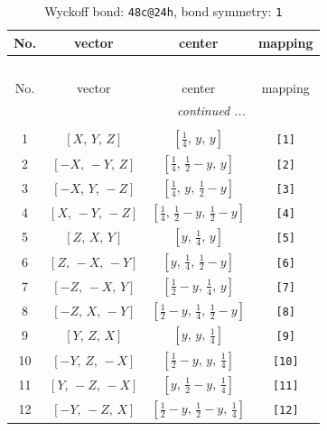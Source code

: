 \documentclass[fleqn,8pt]{jsarticle}
\begin{document}
\begin{longtable}{cccc}
\caption{Wyckoff bond: {\tt 48c@24h}, bond symmetry: {\tt 1}}
 \\
 \hline \hline
No. & vector & center & mapping \\ \hline \endfirsthead

\multicolumn{3}{l}{\tablename\ \thetable{}} \\
 \hline \hline
No. & vector & center & mapping \\ \hline \endhead

 \hline \hline
\multicolumn{3}{r}{\footnotesize\it continued ...} \\ \endfoot

 \hline \hline
\multicolumn{3}{r}{} \\ \endlastfoot

1 & $\left[ X,\, Y,\, Z \right]$ & $\left[ \frac{1}{4},\, y,\, y \right]$ & {\tt [1]} \\ \hline
2 & $\left[ - X,\, - Y,\, Z \right]$ & $\left[ \frac{1}{4},\, \frac{1}{2} - y,\, y \right]$ & {\tt [2]} \\ \hline
3 & $\left[ - X,\, Y,\, - Z \right]$ & $\left[ \frac{1}{4},\, y,\, \frac{1}{2} - y \right]$ & {\tt [3]} \\ \hline
4 & $\left[ X,\, - Y,\, - Z \right]$ & $\left[ \frac{1}{4},\, \frac{1}{2} - y,\, \frac{1}{2} - y \right]$ & {\tt [4]} \\ \hline
5 & $\left[ Z,\, X,\, Y \right]$ & $\left[ y,\, \frac{1}{4},\, y \right]$ & {\tt [5]} \\ \hline
6 & $\left[ Z,\, - X,\, - Y \right]$ & $\left[ y,\, \frac{1}{4},\, \frac{1}{2} - y \right]$ & {\tt [6]} \\ \hline
7 & $\left[ - Z,\, - X,\, Y \right]$ & $\left[ \frac{1}{2} - y,\, \frac{1}{4},\, y \right]$ & {\tt [7]} \\ \hline
8 & $\left[ - Z,\, X,\, - Y \right]$ & $\left[ \frac{1}{2} - y,\, \frac{1}{4},\, \frac{1}{2} - y \right]$ & {\tt [8]} \\ \hline
9 & $\left[ Y,\, Z,\, X \right]$ & $\left[ y,\, y,\, \frac{1}{4} \right]$ & {\tt [9]} \\ \hline
10 & $\left[ - Y,\, Z,\, - X \right]$ & $\left[ \frac{1}{2} - y,\, y,\, \frac{1}{4} \right]$ & {\tt [10]} \\ \hline
11 & $\left[ Y,\, - Z,\, - X \right]$ & $\left[ y,\, \frac{1}{2} - y,\, \frac{1}{4} \right]$ & {\tt [11]} \\ \hline
12 & $\left[ - Y,\, - Z,\, X \right]$ & $\left[ \frac{1}{2} - y,\, \frac{1}{2} - y,\, \frac{1}{4} \right]$ & {\tt [12]} \\ \hline

\end{longtable}
\end{document}
